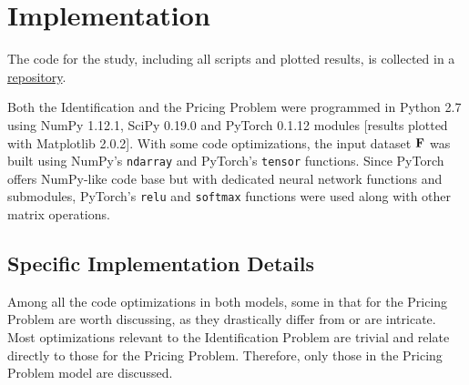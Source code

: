 \appendix
\chapter{Implementation} \label{app:Implementation}
The code for the study, including all scripts and plotted results, is collected in a \href{https://github.com/anmolkabra}{repository}.

Both the Identification and the Pricing Problem were programmed in Python 2.7 using NumPy 1.12.1, SciPy 0.19.0 and PyTorch 0.1.12 modules \cite{NPDocs,SCPOptimizeDocs,PTDocs} [results plotted with Matplotlib 2.0.2]. With some code optimizations, the input dataset $\mathbf{F}$ was built using NumPy's \texttt{ndarray} and PyTorch's \texttt{tensor} functions. Since PyTorch offers NumPy-like code base but with dedicated neural network functions and submodules, PyTorch's \texttt{relu} and \texttt{softmax} functions were used along with other matrix operations.

\section{Specific Implementation Details} \label{app:Specific Implementation Details}
Among all the code optimizations in both models, some in that for the Pricing Problem are worth discussing, as they drastically differ from  or are intricate. Most optimizations relevant to the Identification Problem are trivial and relate directly to those for the Pricing Problem. Therefore, only those in the Pricing Problem model are discussed.

